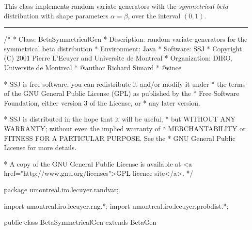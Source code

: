 
This class implements random variate generators with the
\emph{symmetrical beta} distribution with shape parameters  $\alpha = \beta$,
over the interval  $(0,1)$.


\bigskip\hrule

\begin{code}
\begin{hide}
/*
 * Class:        BetaSymmetricalGen
 * Description:  random variate generators for the symmetrical beta distribution
 * Environment:  Java
 * Software:     SSJ
 * Copyright (C) 2001  Pierre L'Ecuyer and Universite de Montreal
 * Organization: DIRO, Universite de Montreal
 * @author       Richard Simard
 * @since

 * SSJ is free software: you can redistribute it and/or modify it under
 * the terms of the GNU General Public License (GPL) as published by the
 * Free Software Foundation, either version 3 of the License, or
 * any later version.

 * SSJ is distributed in the hope that it will be useful,
 * but WITHOUT ANY WARRANTY; without even the implied warranty of
 * MERCHANTABILITY or FITNESS FOR A PARTICULAR PURPOSE.  See the
 * GNU General Public License for more details.

 * A copy of the GNU General Public License is available at
   <a href="http://www.gnu.org/licenses">GPL licence site</a>.
 */
\end{hide}
package umontreal.iro.lecuyer.randvar;\begin{hide}
import umontreal.iro.lecuyer.rng.*;
import umontreal.iro.lecuyer.probdist.*;
\end{hide}

public class BetaSymmetricalGen extends BetaGen \begin{hide} {
\end{hide}
\end{code}

